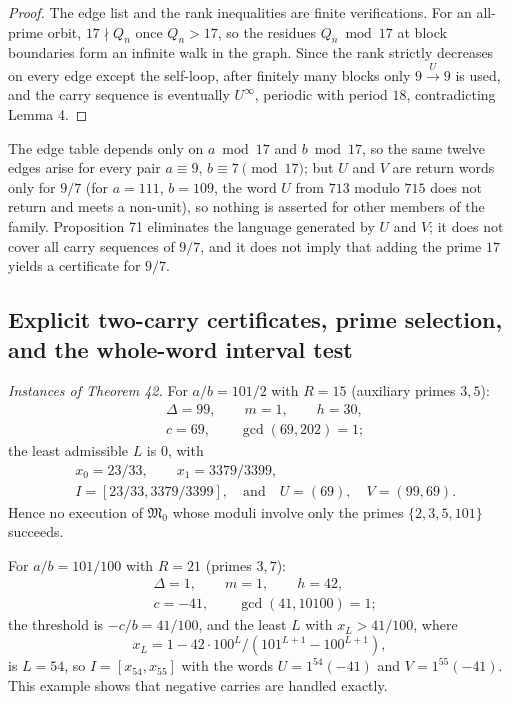 \documentclass[11pt,reqno]{amsart}
\theoremstyle{definition}
\theoremstyle{remark}
\begin{document}
\begin{proof}\leavevmode\label{proof:71}
The edge list and the rank inequalities are finite
verifications. For an all-prime orbit, \(17\nmid Q_n\) once \(Q_n>17\),
so the residues \(Q_n\bmod17\) at block boundaries form an infinite walk
in the graph. Since the rank strictly decreases on every edge except the
self-loop, after finitely many blocks only \(9\xrightarrow{U}9\) is
used, and the carry sequence is eventually \(U^\infty\), periodic with
period \(18\), contradicting Lemma 4. \qedhere
\end{proof}

The edge table depends only on \(a\bmod17\) and \(b\bmod17\), so the
same twelve edges arise for every pair \(a\equiv9\), \(b\equiv7\pmod{17}\);
but \(U\) and \(V\) are return words only for \(9/7\) (for
\(a=111\), \(b=109\), the word \(U\) from \(713\) modulo \(715\) does
not return and meets a non-unit), so nothing is asserted for other
members of the family. Proposition 71 eliminates the language generated
by \(U\) and \(V\); it does not cover all carry sequences of \(9/7\),
and it does not imply that adding the prime \(17\) yields a certificate
for \(9/7\).

\subsection{Explicit two-carry certificates, prime selection, and the whole-word interval test}\label{sec:E.4}

\emph{Instances of Theorem 42.} For \(a/b=101/2\) with \(R=15\) (auxiliary
primes \(3,5\)):
\[
\begin{aligned}
&\Delta=99,\qquad m=1,\qquad h=30,\\
&c=69,\qquad \gcd(69,202)=1;
\end{aligned}
\]
the least admissible \(L\) is \(0\), with
\[
\begin{aligned}
&x_0=23/33,\qquad x_1=3379/3399,\\
&I=[23/33,3379/3399],\quad\text{and}\quad U=(69),\quad V=(99,69).
\end{aligned}
\]
Hence no execution of \(\mathfrak M_0\) whose
moduli involve only the primes \(\{2,3,5,101\}\) succeeds.

For
\(a/b=101/100\) with \(R=21\) (primes \(3,7\)):
\[
\begin{aligned}
&\Delta=1,\qquad m=1,\qquad h=42,\\
&c=-41,\qquad \gcd(41,10100)=1;
\end{aligned}
\]
the threshold is
\(-c/b=41/100\), and the least \(L\) with \(x_L>41/100\), where
\[
x_L=1-42\cdot100^L/(101^{L+1}-100^{L+1}),
\]
is \(L=54\), so
\(I=[x_{54},x_{55}]\) with the words \(U=1^{54}(-41)\) and
\(V=1^{55}(-41)\). This example shows that negative carries are handled
exactly.
\end{document}
